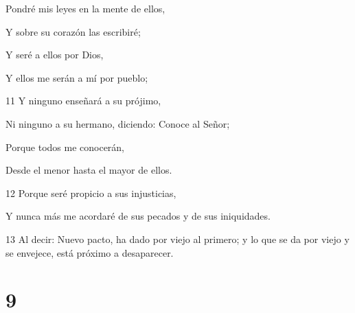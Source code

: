 \par Pondré mis leyes en la mente de ellos,
\par Y sobre su corazón las escribiré;
\par Y seré a ellos por Dios,
\par Y ellos me serán a mí por pueblo;
\par 11 Y ninguno enseñará a su prójimo,
\par Ni ninguno a su hermano, diciendo: Conoce al Señor;
\par Porque todos me conocerán,
\par Desde el menor hasta el mayor de ellos.
\par 12 Porque seré propicio a sus injusticias,
\par Y nunca más me acordaré de sus pecados y de sus iniquidades.
\par 13 Al decir: Nuevo pacto, ha dado por viejo al primero; y lo que se da por viejo y se envejece, está próximo a desaparecer.

\chapter{9}

